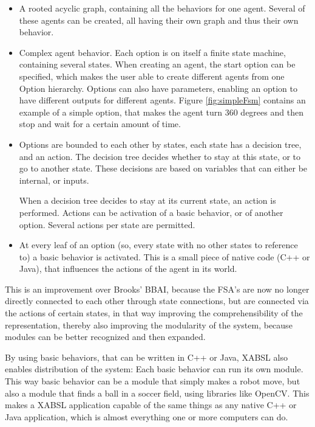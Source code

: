 \documentclass[a4paper,10pt]{article}
\begin{document}
\begin{itemize}
\item {} A rooted acyclic graph, containing all the behaviors for one
agent. Several of these agents can be created, all having their own graph and
thus their own behavior.
\item {} Complex agent behavior. Each option is on itself a finite
state machine, containing several states. When creating an agent, the start
option can be specified, which makes the user able to create different agents
from one Option hierarchy. Options can also have parameters, enabling an option
to have different outputs for different agents. Figure \ref{fig:simpleFsm}
contains an example of a simple option, that makes the agent turn 360 degrees
and then stop and wait for a certain amount of time.
\item {} Options are bounded to each other by states, each state has
a decision tree, and an action. The decision tree decides whether to stay at
this state, or to go to another state. These decisions are based on variables
that can either be internal, or inputs.

When a decision tree decides to stay at its current state, an action is
performed. Actions can be activation of a basic behavior, or of another option.
Several actions per state are permitted.
\item {} At every leaf of an option (so, every state with no
other states to reference to) a basic behavior is activated. This is a small
piece of native code (C++ or Java), that influences the actions of the agent
in its world. 
\end{itemize}

This is an improvement over Brooks' BBAI, because the FSA's are now no
longer directly connected to each other through state connections, but are
connected via the actions of
certain states, in that way improving the comprehensibility of the
representation, thereby also improving the modularity of the system, because
modules can be better recognized and then expanded.

By using basic behaviors, that can be written in C++ or Java, XABSL also
enables distribution of the system: Each basic behavior can run its own module.
This way basic behavior can be a module that simply makes a robot move, but also a
module that finds a ball in a soccer field, using libraries like OpenCV. This
makes a XABSL application capable of the same things as any native C++ or Java
application, which is almost everything one or more computers can do.
\end{document}
